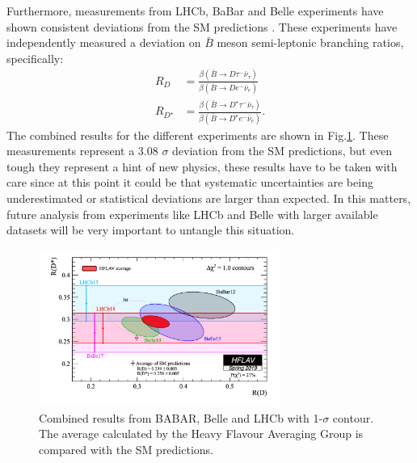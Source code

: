 Furthermore, measurements from LHCb, BaBar and Belle experiments have shown consistent deviations from the SM predictions \cite{Ciezarek_2017}. These experiments have independently measured a deviation on $\bar{B}$ meson semi-leptonic branching ratios, specifically:
\begin{align}
	R_D&=\frac{\beta(\bar{B}\to D\tau^-\bar{\nu}_\tau)}{\beta(\bar{B}\to De^-\bar{\nu}_e)}
	\\
	R_{D^\star}&=\frac{\beta(\bar{B}\to D^\star\tau^-\bar{\nu}_\tau)}{\beta(\bar{B}\to D^\star e^-\bar{\nu}_e)}.
\end{align}
The combined results for the different experiments are shown in Fig.\ref{Fig3}. These measurements represent a 3.08 $\sigma$
 deviation from the SM predictions, but even tough they represent a hint of new physics, these results have to be taken with care since at this point it could be that systematic uncertainties are being underestimated or statistical deviations are larger than expected. In this matters, future analysis from experiments like LHCb and Belle with larger available datasets will be very important to untangle this situation.
 \begin{figure}[h]
 	\centering
 	\includegraphics[width=0.7\textwidth]{figures/Fig3}
 	\caption{Combined results from BABAR, Belle and LHCb with 1-$\sigma$ contour. The average calculated by the Heavy Flavour Averaging Group \cite{HFAG}  is compared with the SM predictions.}
 	\label{Fig3}
 \end{figure}